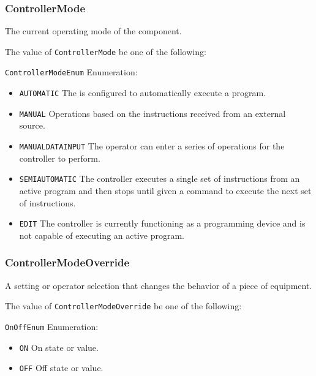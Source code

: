 \subsubsection{ControllerMode}
\label{sec:ControllerMode}



The current operating mode of the  component.


The value of \texttt{ControllerMode} \MUST be one of the following: 


\texttt{ControllerModeEnum} Enumeration:

\begin{itemize}
\item \texttt{AUTOMATIC} \newline The  is configured to automatically execute a program. 
\item \texttt{MANUAL} \newline Operations based on the instructions received from an external source. 
\item \texttt{MANUAL\textunderscore DATA\textunderscore INPUT} \newline The operator can enter a series of operations for the controller to perform. 
\item \texttt{SEMI\textunderscore AUTOMATIC} \newline The controller  executes a single set of instructions from an active program and then stops until given a command to execute the next set of instructions. 
\item \texttt{EDIT} \newline The controller is currently functioning as a programming device and is not capable of executing an active program. 
\end{itemize}



\subsubsection{ControllerModeOverride}
\label{sec:ControllerModeOverride}



A setting or operator selection that changes the behavior of a piece of equipment.


The value of \texttt{ControllerModeOverride} \MUST be one of the following: 


\texttt{OnOffEnum} Enumeration:

\begin{itemize}
\item \texttt{ON} \newline On state or value. 
\item \texttt{OFF} \newline Off state or value. 
\end{itemize}


